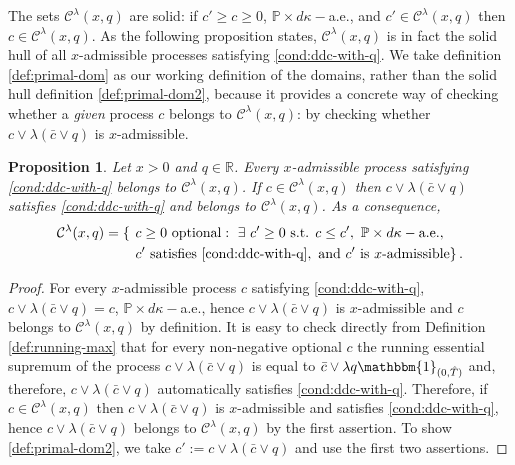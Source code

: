 \documentclass[11pt, oneside]{article}   	%
\theoremstyle{plain}
\newtheorem{prop}[thm]{Proposition}
\theoremstyle{definition}
\theoremstyle{remark}
\begin{document}
The sets $\mathcal{C}^\lambda(x,q)$ are solid: if $c'\geq c\geq 0$, $\mathbb{P}\times d\kappa-$a.e., and $c'\in\mathcal{C}^\lambda(x,q)$ then $c\in\mathcal{C}^\lambda(x,q)$. As the following proposition states, $\mathcal{C}^\lambda(x,q)$ is in fact the solid hull of all $x$-admissible processes satisfying \eqref{cond:ddc-with-q}. We take definition \eqref{def:primal-dom} as our working definition of the domains, rather than the solid hull definition \eqref{def:primal-dom2}, because it provides a concrete way of checking whether a \textit{given} process $c$ belongs to $\mathcal{C}^\lambda(x,q)$: by checking whether $c\vee\lambda(\bar{c}\vee q)$ is $x$-admissible.
\begin{prop}\label{prop:C-is-closed}
Let $x>0$ and $q\in\mathbb{R}$. Every $x$-admissible process satisfying \eqref{cond:ddc-with-q} belongs to $\mathcal{C}^\lambda(x,q)$. If $c\in\mathcal{C}^\lambda(x,q)$ then $c\vee \lambda(\bar{c}\vee q)$ satisfies \eqref{cond:ddc-with-q} and belongs to $\mathcal{C}^\lambda(x,q)$.  As a consequence,
\begin{equation}\label{def:primal-dom2}
\begin{aligned}
\mathcal{C}^\lambda(x,q)=\left\{\right.&\left. c\geq 0\text{ optional}:\ \exists\ c'\geq 0 \text{ s.t. } c\leq c',\ \mathbb{P}\times d\kappa-\text{a.e.},\right.\\
&\left. c' \text{ satisfies }\eqref{cond:ddc-with-q},\text{ and }c'\text{ is } x\text{-admissible}\right\}.
\end{aligned}
\end{equation}
\end{prop}
\begin{proof}
For  every $x$-admissible process $c$ satisfying \eqref{cond:ddc-with-q}, $c\vee \lambda(\bar{c}\vee q)=c$, $\mathbb{P}\times d\kappa-$a.e., hence $c\vee \lambda(\bar{c}\vee q)$ is $x$-admissible and $c$ belongs to $\mathcal{C}^\lambda(x,q)$ by definition. It is easy to check directly from Definition \ref{def:running-max} that for every non-negative optional $c$ the running essential supremum of the process $c\vee \lambda(\bar{c}\vee q)$ is equal to $\bar{c}\vee \lambda q\mathbbm{1}_{(0,\hat{T})}$ and, therefore, $c\vee \lambda(\bar{c}\vee q)$ automatically satisfies \eqref{cond:ddc-with-q}. Therefore, if $c\in\mathcal{C}^\lambda(x,q)$ then $c\vee \lambda(\bar{c}\vee q)$ is $x$-admissible and satisfies \eqref{cond:ddc-with-q}, hence $c\vee \lambda(\bar{c}\vee q)$ belongs to $\mathcal{C}^\lambda(x,q)$ by the first assertion. To show \eqref{def:primal-dom2}, we take $c':=c\vee \lambda(\bar{c}\vee q)$ and use the first two assertions.
\end{proof}
\end{document}

